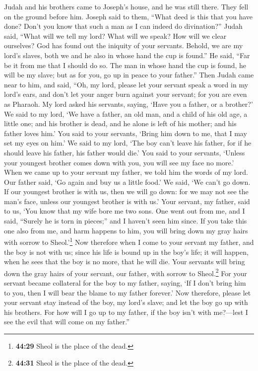  Judah and his brothers came to Joseph's house, and he
was still there. They fell on the ground before him. 
Joseph said to them, ``What deed is this that you have done? Don't you
know that such a man as I can indeed do divination?'' 
Judah said, ``What will we tell my lord? What will we speak? How will we
clear ourselves? God has found out the iniquity of your servants.
Behold, we are my lord's slaves, both we and he also in whose hand the
cup is found.''  He said, ``Far be it from me that I
should do so. The man in whose hand the cup is found, he will be my
slave; but as for you, go up in peace to your father.'' 
Then Judah came near to him, and said, ``Oh, my lord, please let your
servant speak a word in my lord's ears, and don't let your anger burn
against your servant; for you are even as Pharaoh.  My
lord asked his servants, saying, `Have you a father, or a brother?'
 We said to my lord, `We have a father, an old man, and a
child of his old age, a little one; and his brother is dead, and he
alone is left of his mother; and his father loves him.' 
You said to your servants, `Bring him down to me, that I may set my eyes
on him.'  We said to my lord, `The boy can't leave his
father, for if he should leave his father, his father would die.'
 You said to your servants, `Unless your youngest brother
comes down with you, you will see my face no more.'  When
we came up to your servant my father, we told him the words of my lord.
 Our father said, `Go again and buy us a little food.'
 We said, `We can't go down. If our youngest brother is
with us, then we will go down: for we may not see the man's face, unless
our youngest brother is with us.'  Your servant, my
father, said to us, `You know that my wife bore me two sons.
 One went out from me, and I said, ``Surely he is torn in
pieces;'' and I haven't seen him since.  If you take this
one also from me, and harm happens to him, you will bring down my gray
hairs with sorrow to Sheol.'\footnote{\textbf{44:29} Sheol is the place
  of the dead.}  Now therefore when I come to your
servant my father, and the boy is not with us; since his life is bound
up in the boy's life;  it will happen, when he sees that
the boy is no more, that he will die. Your servants will bring down the
gray hairs of your servant, our father, with sorrow to Sheol.\footnote{\textbf{44:31}
  Sheol is the place of the dead.}  For your servant
became collateral for the boy to my father, saying, `If I don't bring
him to you, then I will bear the blame to my father forever.'
 Now therefore, please let your servant stay instead of
the boy, my lord's slave; and let the boy go up with his brothers.
 For how will I go up to my father, if the boy isn't with
me?---lest I see the evil that will come on my father.''

